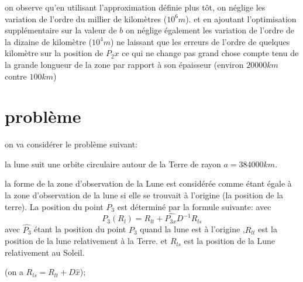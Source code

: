 \documentclass{article} %
\begin{document}
		on observe qu'en utilisant l'approximation définie plus tôt, on néglige les variation de l'ordre du millier de kilomètres ($10^6 m$). et en ajoutant l'optimisation supplémentaire sur la valeur de $b$ on néglige également les variation de l'ordre de la dizaine de kilomètre ($10^4 m$) ne laissant que les erreurs de l'ordre de quelques kilomètre sur la position de $P_2x$ ce qui ne change pas grand chose compte tenu de la grande longueur de la zone par rapport à son épaisseur (environ $ 20000 km $ contre $100 km$)
		
		
		
		
		
		\section{problème}
		
		on va considérer le problème suivant:
		
		la lune suit une orbite circulaire autour de la Terre de rayon $a=384000km$.
		
		la forme de la zone d'observation de la Lune est considérée comme étant égale à la zone d'observation de la lune si elle se trouvait à l'origine (la position de la terre). La position du point $P_3$ est déterminé par la formule suivante:
		avec 
		$$
		P_3(R_l)=R_{lt}+\hat{P_{3x}}D^{-1}R_{ls}
		$$
		avec $\hat{P_3}$ étant la position du point $P_3$ quand la lune est à l'origine
		,$R_{lt}$ est la position de la lune relativement à la Terre.
		et $R_{ls}$ est la position de la Lune relativement au Soleil.
		
		(on a $R_{ls} = R_{lt}+D\hat{x}$);
		
\end{document}
